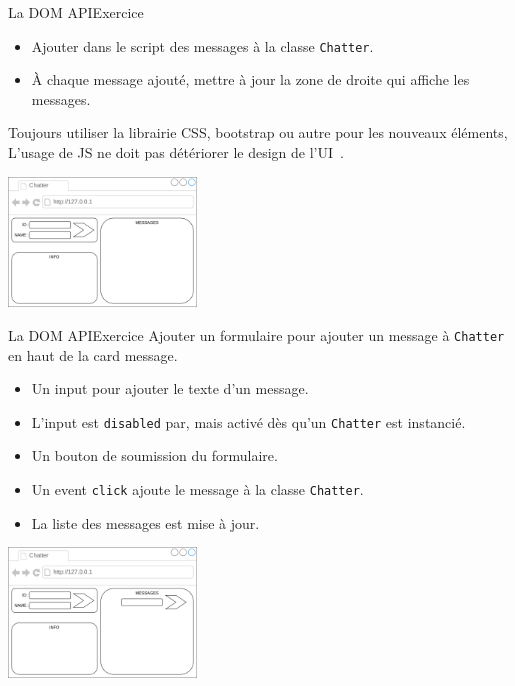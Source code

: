 \documentclass{beamer}
\begin{document}
    \begin{frame}{La DOM API}{Exercice \execcounterdispinc{}}
        \begin{itemize}
            \item Ajouter dans le script des messages à la classe \lstinline{Chatter}.
            \item À chaque message ajouté, mettre à jour la zone de droite qui affiche les messages.
        \end{itemize}
        \begin{dangercolorbox}
            Toujours utiliser la librairie CSS, bootstrap ou autre pour les nouveaux éléments, L'usage de JS ne doit pas détériorer le design de l'UI~.
        \end{dangercolorbox}
        \bigbreak
        \center
        \includegraphics[width=5cm]{image/chatter-maquette}
    \end{frame}

    \begin{frame}{La DOM API}{Exercice \execcounterdispinc{}}
        Ajouter un formulaire pour ajouter un message à \lstinline{Chatter} en haut de la card message.
        \begin{itemize}
            \item Un input pour ajouter le texte d'un message.
            \item L'input est \lstinline{disabled} par, mais activé dès qu'un \lstinline{Chatter} est instancié.
            \item Un bouton de soumission du formulaire.
            \item Un event \lstinline{click} ajoute le message à la classe \lstinline{Chatter}.
            \item La liste des messages est mise à jour.
        \end{itemize}
        \bigbreak
        \center
        \includegraphics[width=5cm]{image/chatter-maquette-2}
    \end{frame}
\end{document}
